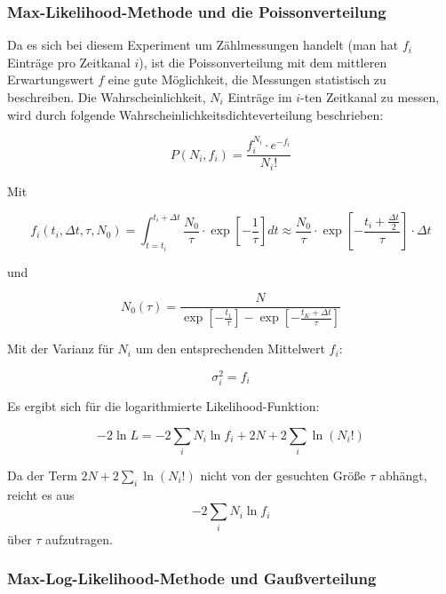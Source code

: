 \documentclass[slug=LM, room=Andreas-Schubert-Bau\,\ K\ 1A, supervisor=Anne-Sophie\ Berthold, coursedate=13.\ 12.\ 2019]{../../Lab_Report_LaTeX/lab_report}
\begin{document}
\subsubsection{Max-Likelihood-Methode und die Poissonverteilung}
\label{sec:likepoisson}

Da es sich bei diesem Experiment um Zählmessungen handelt (man hat \(f_i\) Einträge pro
Zeitkanal \(i\)), ist die Poissonverteilung mit dem mittleren Erwartungswert \(f\) eine gute
Möglichkeit, die Messungen statistisch zu  beschreiben. Die Wahrscheinlichkeit, \(N_i\) Einträge
im \(i\)-ten Zeitkanal zu messen, wird durch folgende Wahrscheinlichkeitsdichteverteilung
beschrieben:

\begin{equation}\label{eq:poisson}
 P(N_i,f_i) = \frac{f_i^{N_i} \cdot e^{-f_i}}{N_i !}
\end{equation}

Mit

\begin{equation}\label{eq:fipoisson}
 f_i(t_i,\Delta t, \tau, N_0) = \int_{t=t_i}^{t_i+\Delta t} \frac{N_0}{\tau} \cdot \exp[-\frac{1}{\tau}] dt \approx \frac{N_0}{\tau} \cdot \exp[-\frac{t_i+\frac{\Delta t}{2}}{\tau}] \cdot \Delta t
\end{equation}

und

\begin{equation}\label{eq:N0poisson}
	N_0(\tau) = \frac{N}{\exp[-\frac{t_1}{\tau}]-\exp[-\frac{t_K+\Delta t}{\tau}]}
\end{equation}

Mit der Varianz für \(N_i\) um den entsprechenden Mittelwert \(f_i\):

\begin{equation}\label{key}
 \sigma_i^2 = f_i
\end{equation}

Es ergibt sich für die logarithmierte Likelihood-Funktion:

\begin{equation}\label{key}
 -2\ln L = -2\sum_{i} N_i \ln f_i +2N +2\sum_{i} \ln(N_i!)
\end{equation}

Da der Term \(2N +2\sum_{i} \ln(N_i!)\) nicht von der gesuchten Größe \(\tau\) abhängt, reicht es
aus
\begin{equation}
  \label{eq:finalpoisson}
  -2\sum_{i} N_i \ln f_i
\end{equation}
über \(\tau\) aufzutragen.

\subsubsection{Max-Log-Likelihood-Methode und Gaußverteilung}
\label{sec:likegauss}
\end{document}
